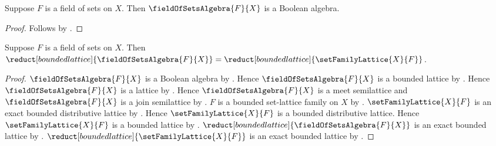 \begin{classification}\label{field_of_sets_algebra_is_boolean_algebra}
    Suppose $F$ is a field of sets on $X$.
    Then $\fieldOfSetsAlgebra{F}{X}$ is a Boolean algebra.
\end{classification}
\begin{proof}
    Follows by
        .
\end{proof}

\begin{theorem}\label{field_of_sets_algebra_bounded_lattice_reduct}
    Suppose $F$ is a field of sets on $X$.
    Then
        $\reduct[bounded lattice]{\fieldOfSetsAlgebra{F}{X}}
            =\reduct[bounded lattice]{\setFamilyLattice{X}{F}}$.
\end{theorem}
\begin{proof}
    $\fieldOfSetsAlgebra{F}{X}$ is a Boolean algebra by
        .
    Hence $\fieldOfSetsAlgebra{F}{X}$ is a bounded lattice by
        .
    Hence $\fieldOfSetsAlgebra{F}{X}$ is a lattice by
        .
    Hence $\fieldOfSetsAlgebra{F}{X}$ is a meet semilattice and
        $\fieldOfSetsAlgebra{F}{X}$ is a join semilattice by
        .
    $F$ is a bounded set-lattice family on $X$ by
        .
    $\setFamilyLattice{X}{F}$ is an exact bounded distributive lattice by
        .
    Hence $\setFamilyLattice{X}{F}$ is a bounded distributive lattice.
    Hence $\setFamilyLattice{X}{F}$ is a bounded lattice by
        .
    $\reduct[bounded lattice]{\fieldOfSetsAlgebra{F}{X}}$
        is an exact bounded lattice by
        .
    $\reduct[bounded lattice]{\setFamilyLattice{X}{F}}$
        is an exact bounded lattice by
        .


\end{proof}
